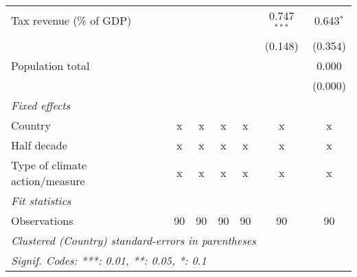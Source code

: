 \begin{tabular}{lcccccc}
   Tax revenue (\% of GDP)                              &           &                 &                 &                 & 0.747$^{***}$    & 0.643$^{*}$\\   
                                                        &           &                 &                 &                 & (0.148)          & (0.354)\\   
   Population total                                     &           &                 &                 &                 &                  & 0.000\\   
                                                        &           &                 &                 &                 &                  & (0.000)\\   
   \emph{Fixed effects}\\
   Country                                              & x         & x               & x               & x               & x                & x\\  
   Half decade                                          & x         & x               & x               & x               & x                & x\\  
   Type of climate action/measure                       & x         & x               & x               & x               & x                & x\\  
   \midrule \emph{Fit statistics}\\
   Observations                                         & 90        & 90              & 90              & 90              & 90               & 90\\  
   \midrule
   \multicolumn{7}{l}{\emph{Clustered (Country) standard-errors in parentheses}}\\
   \multicolumn{7}{l}{\emph{Signif. Codes: ***: 0.01, **: 0.05, *: 0.1}}\\
\end{tabular}
\par\endgroup


